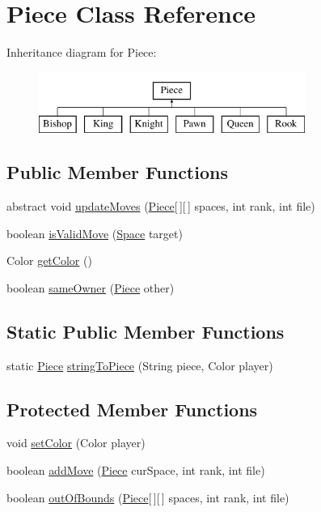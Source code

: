 \hypertarget{class_piece}{\section{Piece Class Reference}
\label{class_piece}
}
Inheritance diagram for Piece\-:\begin{figure}[H]
\begin{center}
\leavevmode
\includegraphics[height=2.000000cm]{class_piece}
\end{center}
\end{figure}
\subsection*{Public Member Functions}
\begin{DoxyCompactItemize}
\item 
abstract void \hyperlink{class_piece_a4a6c2b5c5d4dd5e3fa08f3a4cb97c9ba}{update\-Moves} (\hyperlink{class_piece}{Piece}\mbox{[}$\,$\mbox{]}\mbox{[}$\,$\mbox{]} spaces, int rank, int file)
\item 
boolean \hyperlink{class_piece_a6c777344ee49d908f6c3cf43948a204d}{is\-Valid\-Move} (\hyperlink{class_space}{Space} target)
\item 
Color \hyperlink{class_piece_a076592733b1498c5bc04ac61059eb1cc}{get\-Color} ()
\item 
boolean \hyperlink{class_piece_a3b293d270e867e61341b27df6d71c5da}{same\-Owner} (\hyperlink{class_piece}{Piece} other)
\end{DoxyCompactItemize}
\subsection*{Static Public Member Functions}
\begin{DoxyCompactItemize}
\item 
static \hyperlink{class_piece}{Piece} \hyperlink{class_piece_aa6ae6ab5e1f16bdb941f9798362b3c66}{string\-To\-Piece} (String piece, Color player)
\end{DoxyCompactItemize}
\subsection*{Protected Member Functions}
\begin{DoxyCompactItemize}
\item 
void \hyperlink{class_piece_aa9ea4ff0dd0e931fc3ad928233fbd281}{set\-Color} (Color player)
\item 
boolean \hyperlink{class_piece_a9dfc2ca9c8375ca29deb561255c4ce9b}{add\-Move} (\hyperlink{class_piece}{Piece} cur\-Space, int rank, int file)
\item 
boolean \hyperlink{class_piece_a140ea5008973d6cceb3ede41ef57b2c1}{out\-Of\-Bounds} (\hyperlink{class_piece}{Piece}\mbox{[}$\,$\mbox{]}\mbox{[}$\,$\mbox{]} spaces, int rank, int file)
\end{DoxyCompactItemize}
